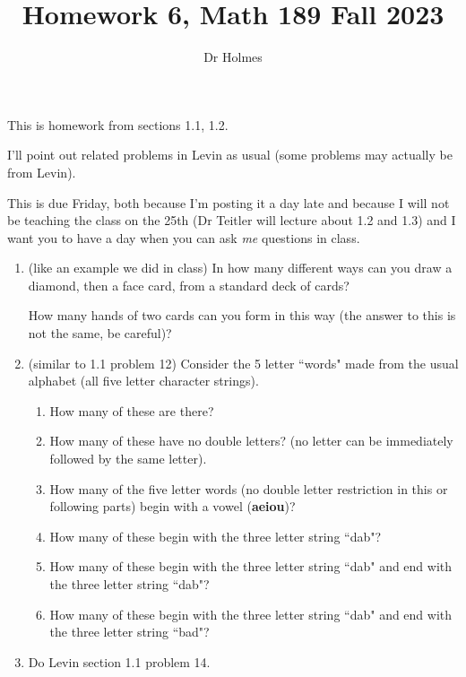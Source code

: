 \documentclass[12pt]{article}
\title{Homework 6, Math 189 Fall 2023}
\author{Dr Holmes}
\begin{document}
\maketitle

This is homework from sections 1.1, 1.2.

I'll point out related problems in Levin as usual (some problems may actually be from Levin).

This is due Friday, both because I'm posting it a day late and because I will not be teaching the class on the 25th (Dr Teitler will lecture about 1.2 and 1.3) and I want you to have  a day when you can ask {\em me\/} questions in class.

\begin{enumerate}

\item  (like an example we did in class) In how many different ways can you draw a diamond, then a face card, from a standard deck of cards?

How many hands of two cards can you form in this way (the answer to this is not the same, be careful)?

\item  (similar to 1.1 problem 12) Consider the 5 letter ``words" made from the usual alphabet (all five letter character strings).

\begin{enumerate}
 \item  How many of these are there?

\item How many of these have no double letters? (no letter can be immediately followed by the same letter).

\item  How many of the five letter words (no double letter restriction in this or following parts) begin with a vowel ({\bf aeiou})?

\item  How many of these begin with the three letter string ``dab"?

\item How many of these begin with the three letter string ``dab" and end with the three letter string ``dab"?

\item How many of these begin with the three letter string ``dab" and end with the three letter string ``bad"?

\end{enumerate}

\item  Do Levin section 1.1 problem 14.


\end{enumerate}
\end{document}
